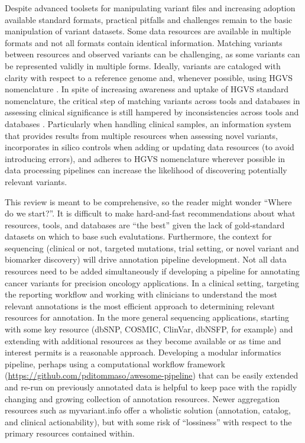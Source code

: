\documentclass{article}
\begin{document}
Despite advanced toolsets for manipulating variant files and
increasing adoption available standard formats, practical pitfalls and
challenges remain to the basic manipulation of variant datasets. Some
data resources are available in multiple formats and not all formats
contain identical information. Matching variants between resources and
observed variants can be challenging, as some variants can be
represented validly in multiple forms. Ideally, variants are cataloged
with clarity with respect to a reference genome and, whenever
possible, using HGVS nomenclature \parencite{Den_Dunnen2016-gw}. In spite
of increasing awareness and uptake of HGVS standard nomenclature, the
critical step of matching variants across tools and databases in
assessing clinical significance is still hampered by inconsistencies
across tools and databases \parencite{Yen2017-lq}. Particularly when
handling clinical samples, an information system that provides results
from multiple resources when assessing novel variants, incorporates in
silico controls when adding or updating data resources (to avoid
introducing errors), and adheres to HGVS nomenclature wherever
possible in data processing pipelines can increase the likelihood of
discovering potentially relevant variants.

This review is meant to be comprehensive, so the reader might wonder
``Where do we start?''. It is difficult to make hard-and-fast
recommendations about what resources, tools, and databases are ``the
best'' given the lack of gold-standard datasets on which to base such
evalutations. Furthermore, the context for sequencing (clinical or
not, targeted mutations, trial setting, or novel variant and biomarker
discovery) will drive annotation pipeline development. Not all data resources need
to be added simultaneously if developing a pipeline for annotating
cancer variants for precision oncology applications. In a clinical
setting, targeting the reporting workflow and working with clinicians
to understand the most relevant annotations is the most efficient
approach to determining relevant resources for annotation. In the more
general sequencing applications, starting with some key resource
(dbSNP, COSMIC, ClinVar, dbNSFP, for example) and
extending with additional resources as they become available or as
time and interest permits is a reasonable approach. Developing a modular
informatics pipeline, perhaps using a computational workflow framework
(\url{https://github.com/pditommaso/awesome-pipeline}) that can be easily
extended and re-run on previously annotated data is helpful to keep
pace with the rapidly changing and growing collection of annotation
resources. Newer aggregation resources such as myvariant.info offer a
wholistic solution (annotation, catalog, and clinical actionability),
but with some risk of ``lossiness'' with respect to the primary
resources contained within.
\end{document}
